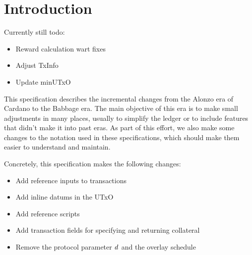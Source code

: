 \section{Introduction}

Currently still todo:

\begin{itemize}
\item Reward calculation wart fixes
\item Adjust TxInfo
\item Update minUTxO
\end{itemize}

This specification describes the incremental changes from the Alonzo
era of Cardano to the Babbage era. The main objective of this era is
to make small adjustments in many places, usually to simplify the
ledger or to include features that didn't make it into past eras. As
part of this effort, we also make some changes to the notation used in
these specifications, which should make them easier to understand and
maintain.

Concretely, this specification makes the following changes:
\begin{itemize}
\item Add reference inputs to transactions
\item Add inline datums in the UTxO
\item Add reference scripts
\item Add transaction fields for specifying and returning collateral
\item Remove the protocol parameter $\mathit{d}$ and the overlay schedule
\end{itemize}

